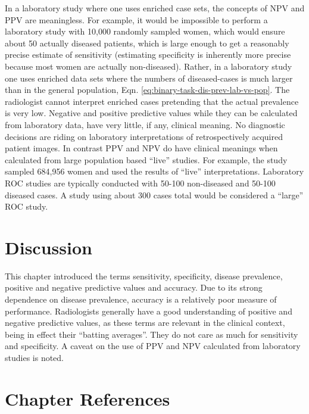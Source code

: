 \documentclass[
]{book}
\begin{document}
In a laboratory study where one uses enriched case sets, the concepts of \(\text{NPV}\) and \(\text{PPV}\) are meaningless. For example, it would be impossible to perform a laboratory study with 10,000 randomly sampled women, which would ensure about 50 actually diseased patients, which is large enough to get a reasonably precise estimate of sensitivity (estimating specificity is inherently more precise because most women are actually non-diseased). Rather, in a laboratory study one uses enriched data sets where the numbers of diseased-cases is much larger than in the general population, Eqn. \eqref{eq:binary-task-dis-prev-lab-vs-pop}. The radiologist cannot interpret enriched cases pretending that the actual prevalence is very low. Negative and positive predictive values while they can be calculated from laboratory data, have very little, if any, clinical meaning. No diagnostic decisions are riding on laboratory interpretations of retrospectively acquired patient images. In contrast \(\text{PPV}\) and \(\text{NPV}\) do have clinical meanings when calculated from large population based ``live'' studies. For example, the \citep{fenton2007influence} study sampled 684,956 women and used the results of ``live'' interpretations. Laboratory ROC studies are typically conducted with 50-100 non-diseased and 50-100 diseased cases. A study using about 300 cases total would be considered a ``large'' ROC study.

\hypertarget{binary-task-discussion}{%
\section{Discussion}\label{binary-task-discussion}}

This chapter introduced the terms sensitivity, specificity, disease prevalence, positive and negative predictive values and accuracy. Due to its strong dependence on disease prevalence, accuracy is a relatively poor measure of performance. Radiologists generally have a good understanding of positive and negative predictive values, as these terms are relevant in the clinical context, being in effect their ``batting averages''. They do not care as much for sensitivity and specificity. A caveat on the use of \(\text{PPV}\) and \(\text{NPV}\) calculated from laboratory studies is noted.

\hypertarget{binary-task-references}{%
\section{Chapter References}\label{binary-task-references}}
\end{document}
